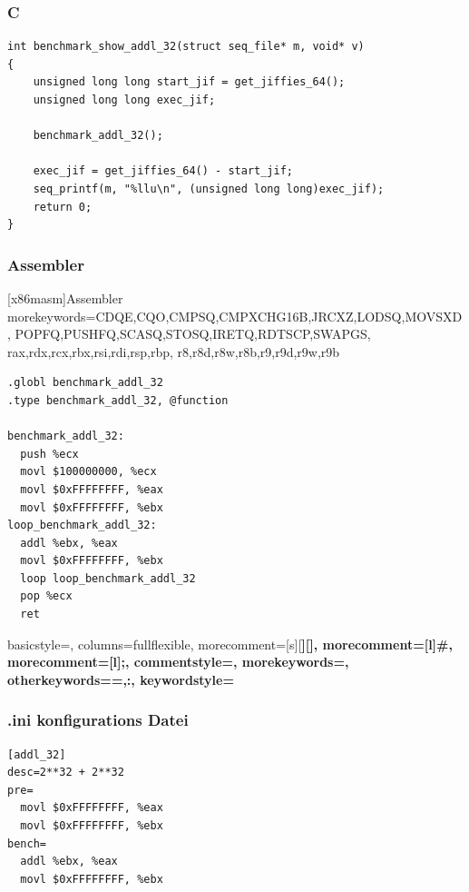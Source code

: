 \documentclass{beamer}
\begin{document}
\begin{frame}[fragile]
\frametitle{C} 

\begin{lstlisting}
int benchmark_show_addl_32(struct seq_file* m, void* v)
{
    unsigned long long start_jif = get_jiffies_64();
    unsigned long long exec_jif;

    benchmark_addl_32();

    exec_jif = get_jiffies_64() - start_jif;
    seq_printf(m, "%llu\n", (unsigned long long)exec_jif);
    return 0;
}

\end{lstlisting}

\end{frame}





\begin{frame}[fragile]
\frametitle{Assembler} 


   [x86masm]{Assembler} %
   {morekeywords={CDQE,CQO,CMPSQ,CMPXCHG16B,JRCXZ,LODSQ,MOVSXD, %
                  POPFQ,PUSHFQ,SCASQ,STOSQ,IRETQ,RDTSCP,SWAPGS, %
                  rax,rdx,rcx,rbx,rsi,rdi,rsp,rbp, %
                  r8,r8d,r8w,r8b,r9,r9d,r9w,r9b}} %

\lstset{language=[x64]Assembler}

\begin{lstlisting}
.globl benchmark_addl_32
.type benchmark_addl_32, @function

benchmark_addl_32:
  push %ecx
  movl $100000000, %ecx
  movl $0xFFFFFFFF, %eax
  movl $0xFFFFFFFF, %ebx
loop_benchmark_addl_32:
  addl %ebx, %eax
  movl $0xFFFFFFFF, %ebx
  loop loop_benchmark_addl_32
  pop %ecx
  ret
\end{lstlisting}
\end{frame}




\begin{frame}[fragile]
{
    basicstyle=\ttfamily\small,
    columns=fullflexible,
    morecomment=[s][\color{blue}\bfseries]{[}{]},
    morecomment=[l]{\#},
    morecomment=[l]{;},
    commentstyle=\color{gray}\ttfamily,
    morekeywords={},
    otherkeywords={=,:},
    keywordstyle={\color{green}\bfseries}
}

\lstset{language=Ini}
\frametitle{.ini konfigurations Datei} 

\begin{lstlisting}
[addl_32]
desc=2**32 + 2**32
pre=
  movl $0xFFFFFFFF, %eax
  movl $0xFFFFFFFF, %ebx
bench=
  addl %ebx, %eax
  movl $0xFFFFFFFF, %ebx
\end{lstlisting}
\end{frame}
\end{document}
